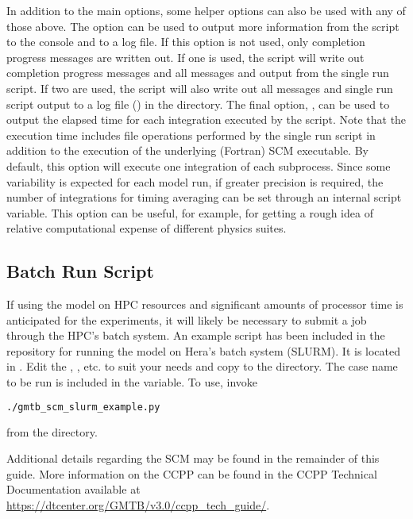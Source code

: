 In addition to the main options, some helper options can also be used with any of those above. The  option can be used to output more information from the script to the console and to a log file. If this option is not used, only completion progress messages are written out. If one  is used, the script will write out completion progress messages and all messages and output from the single run script. If two  are used, the script will also write out all messages and single run script output to a log file () in the  directory. The final option, , can be used to output the elapsed time for each integration executed by the script. Note that the execution time includes file operations performed by the single run script in addition to the execution of the underlying (Fortran) SCM executable. By default, this option will execute one integration of each subprocess. Since some variability is expected for each model run, if greater precision is required, the number of integrations for timing averaging can be set through an internal script variable. This option can be useful, for example, for getting a rough idea of relative computational expense of different physics suites.

\subsection{Batch Run Script}

If using the model on HPC resources and significant amounts of processor time is anticipated for the experiments, it will likely be necessary to submit a job through the HPC's batch system. An example script has been included in the repository for running the model on Hera's batch system (SLURM). It is located in . Edit the , , etc. to suit your needs and copy to the  directory. The case name to be run is included in the  variable. To use, invoke
\begin{lstlisting}[language=bash]
./gmtb_scm_slurm_example.py
\end{lstlisting}
from the  directory.

Additional details regarding the SCM may be found in the remainder of this guide. More information on the CCPP can be found in the CCPP Technical Documentation available at \url{https://dtcenter.org/GMTB/v3.0/ccpp\_tech\_guide/}.

